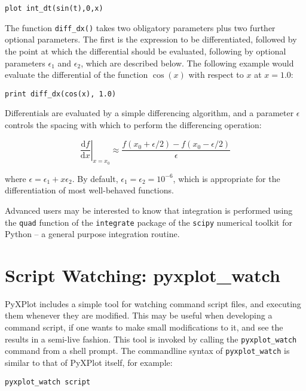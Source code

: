 \documentclass[a4paper,onecolumn,11pt]{book}
\begin{document}
\begin{verbatim}
plot int_dt(sin(t),0,x)
\end{verbatim} 

The function \texttt{diff\_dx()} takes two obligatory parameters plus two
further optional parameters. The first is the expression to be differentiated,
followed by the point at which the differential should be evaluated, following
by optional parameters $\epsilon_1$ and $\epsilon_2$, which are described
below.  The following example would evaluate the differential of the function
$\cos(x)$ with respect to $x$ at $x=1.0$:

\begin{verbatim}
print diff_dx(cos(x), 1.0)
\end{verbatim}

Differentials are evaluated by a simple differencing algorithm, and a parameter
$\epsilon$ controls the spacing with which to perform the differencing
operation:

\begin{displaymath}
\left.\frac{\mathrm{d}f}{\mathrm{d}x}\right|_{x=x_0} \approx \frac{f(x_0+\epsilon/2) - f(x_0-\epsilon/2)}{\epsilon}
\end{displaymath}

\noindent where $\epsilon = \epsilon_1 + x \epsilon_2$. By default, $\epsilon_1
= \epsilon_2 = 10^{-6}$, which is appropriate for the differentiation of most
well-behaved functions.

Advanced users may be interested to know that integration is performed using
the \texttt{quad} function of the \texttt{integrate} package of the
\texttt{scipy} numerical toolkit for Python -- a general purpose integration
routine.

\section{Script Watching: pyxplot\_watch}

PyXPlot includes a simple tool for watching command script files, and executing
them whenever they are modified. This may be useful when developing a command
script, if one wants to make small modifications to it, and see the results in
a semi-live fashion. This tool is invoked by calling the
\texttt{pyxplot\_watch} command
from a shell prompt. The commandline syntax of \texttt{pyxplot\_watch} is
similar to that of PyXPlot itself, for example:

\begin{verbatim}
pyxplot_watch script
\end{verbatim}
\end{document}
